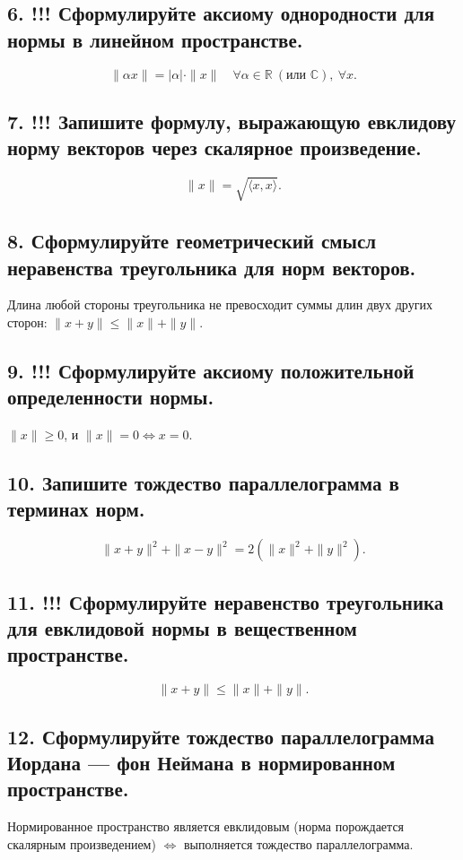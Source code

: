 \documentclass[a4paper,12pt]{article}
\begin{document}
\subsection*{6. !!! Сформулируйте аксиому однородности для нормы в линейном пространстве.}
\[ \|\alpha x\| = |\alpha| \cdot \|x\| \quad \forall \alpha \in \mathbb{R} \ (\text{или } \mathbb{C}), \ \forall x. \]

\subsection*{7. !!! Запишите формулу, выражающую евклидову норму векторов через скалярное произведение.}
\[ \|x\| = \sqrt{\langle x, x \rangle}. \]

\subsection*{8. Сформулируйте геометрический смысл неравенства треугольника для норм векторов.}
Длина любой стороны треугольника не превосходит суммы длин двух других сторон: \(\|x+y\| \le \|x\| + \|y\|\).

\subsection*{9. !!! Сформулируйте аксиому положительной определенности нормы.}
\(\|x\| \ge 0\), и \(\|x\| = 0 \iff x = 0\).

\subsection*{10. Запишите тождество параллелограмма в терминах норм.}
\[ \|x+y\|^2 + \|x-y\|^2 = 2(\|x\|^2 + \|y\|^2). \]

\subsection*{11. !!! Сформулируйте неравенство треугольника для евклидовой нормы в вещественном пространстве.}
\[ \|x+y\| \le \|x\| + \|y\|. \]

\subsection*{12. Сформулируйте тождество параллелограмма Иордана — фон Неймана в нормированном пространстве.}
Нормированное пространство является евклидовым (норма порождается скалярным произведением) \(\iff\) выполняется тождество параллелограмма.
\end{document}
